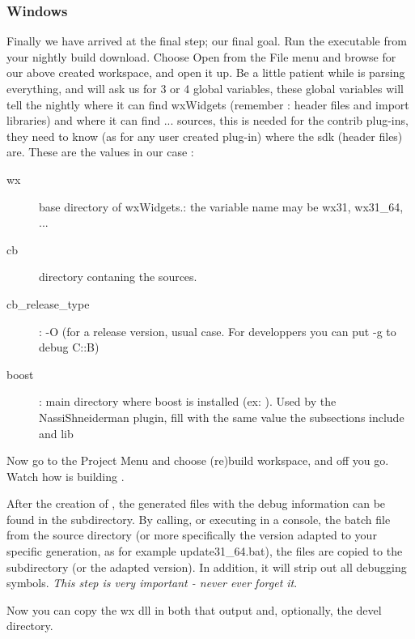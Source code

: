 \subsubsection{Windows}

Finally we have arrived at the final step; our final goal. Run the \codeblocks executable from your nightly build download. Choose Open from the File menu and browse for our above created workspace, and open it up. Be a little patient while \codeblocks is parsing everything, and \codeblocks will ask us for 3 or 4 global variables, these global variables will tell the nightly \codeblocks where it can find wxWidgets (remember : header files and import libraries) and where it can find ... \codeblocks sources, this is needed for the contrib plug-ins, they need to know (as for any user created plug-in) where the sdk (\codeblocks header files) are. These are the values in our case : 
\begin{description}
\item[wx]  base directory of wxWidgets.: the variable name may be wx31, wx31\_64, ...
\item[cb]  \codeblocks directory contaning the sources.
\item[cb\_release\_type] : -O (for a release version, usual case.
         For developpers you can put -g to debug C::B)
\item[boost] : main directory where boost is installed (ex: ).
         Used by the NassiShneiderman plugin,
         fill with the same value the subsections include and lib
\end{description}

Now go to the Project Menu and choose (re)build workspace, and off you go. Watch how \codeblocks is building \codeblocks.

After the creation of \codeblocks, the generated files with the debug information can be found in the  subdirectory. By calling, or executing in a console, the batch file  from the source directory  (or more specifically the version adapted to your specific generation, as for example update31\_64.bat), the files are copied to the  subdirectory (or the adapted version). In addition, it will strip out all debugging symbols. \textit{This step is very important - never ever forget it}.

Now you can copy the wx dll in both that output and, optionally, the devel directory.

